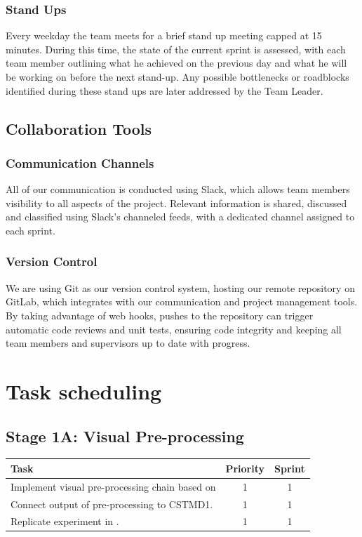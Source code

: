 \documentclass[a4paper,11pt]{article}
\begin{document}
\subsubsection{Stand Ups}
Every weekday the team meets for a brief stand up meeting capped at 15 minutes. During this time, the state of the current sprint is assessed, with each team member outlining what he achieved on the previous day and what he will be working on before the next stand-up. Any possible bottlenecks or roadblocks identified during these stand ups are later addressed by the Team Leader.

\subsection{Collaboration Tools}

\subsubsection{Communication Channels}
All of our communication is conducted using Slack, which allows team members visibility to all aspects of the project. Relevant information is shared, discussed and classified using Slack's channeled feeds, with a dedicated channel assigned to each sprint.

\subsubsection{Version Control}
We are using Git as our version control system, hosting our remote repository on GitLab, which integrates with our communication and project management tools. By taking advantage of web hooks, pushes to the repository can trigger automatic code reviews and unit tests, ensuring code integrity and keeping all team members and supervisors up to date with progress.

\section{Task scheduling}
\subsection{Stage 1A: Visual Pre-processing}
\begin{center}
    \begin{tabular}{p{12cm} c c}
    \textbf{Task} & \textbf{Priority} & \textbf{Sprint} \\ \hline
	Implement visual pre-processing chain based on \cite{hal11} & 1 & 1 \\
	Connect output of pre-processing to CSTMD1. & 1 & 1\\
	Replicate experiment in \cite{w13}. & 1 & 1 \\
    \end{tabular}
\end{center}
\end{document}
